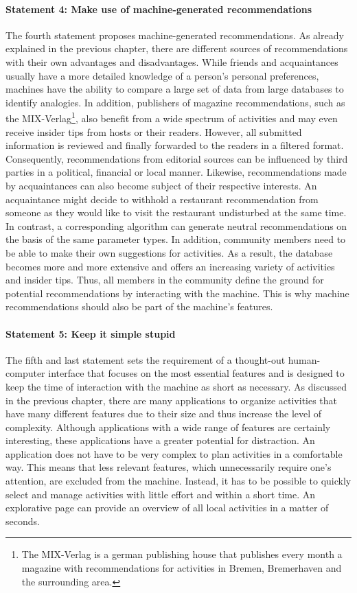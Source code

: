 \documentclass[12pt,numbers=noenddot,parskip,bibliography=totocnumbered,listof=totocnumbered,draft]{scrreprt}
\begin{document}
\paragraph{Statement 4: Make use of machine-generated recommendations}
The fourth statement proposes machine-generated recommendations. As already explained in the previous chapter, there are different sources of recommendations with their own advantages and disadvantages. While friends and acquaintances usually have a more detailed knowledge of a person's personal preferences, machines have the ability to compare a large set of data from large databases to identify analogies. In addition, publishers of magazine recommendations, such as the MIX-Verlag\footnote{The MIX-Verlag is a german publishing house that publishes every month a magazine with recommendations for activities in Bremen, Bremerhaven and the surrounding area.}, also benefit from a wide spectrum of activities and may even receive insider tips from hosts or their readers. However, all submitted information is reviewed and finally forwarded to the readers in a filtered format. Consequently, recommendations from editorial sources can be influenced by third parties in a political, financial or local manner. Likewise, recommendations made by acquaintances can also become subject of their respective interests. An acquaintance might decide to withhold a restaurant recommendation from someone as they would like to visit the restaurant undisturbed at the same time.\newline
In contrast, a corresponding algorithm can generate neutral recommendations on the basis of the same parameter types. In addition, community members need to be able to make their own suggestions for activities. As a result, the database becomes more and more extensive and offers an increasing variety of activities and insider tips. Thus, all members in the community define the ground for potential recommendations by interacting with the machine. This is why machine recommendations should also be part of the machine's features.

\paragraph{Statement 5: Keep it simple stupid}
The fifth and last statement sets the requirement of a thought-out human-computer interface that focuses on the most essential features and is designed to keep the time of interaction with the machine as short as necessary. As discussed in the previous chapter, there are many applications to organize activities that have many different features due to their size and thus increase the level of complexity. Although applications with a wide range of features are certainly interesting, these applications have a greater potential for distraction. An application does not have to be very complex to plan activities in a comfortable way. \newline
This means that less relevant features, which unnecessarily require one's attention, are excluded from the machine. Instead, it has to be possible to quickly select and manage activities with little effort and within a short time. An explorative page can provide an overview of all local activities in a matter of seconds.
\end{document}
